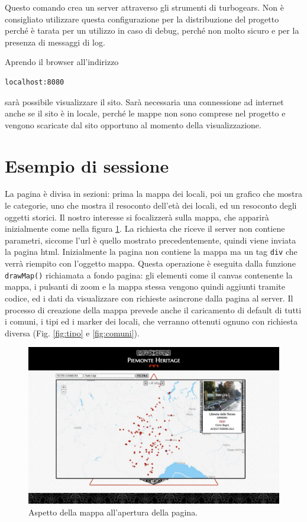 Questo comando crea un server attraverso gli strumenti di turbogears.
Non è consigliato utilizzare questa configurazione per la distribuzione del progetto perché è tarata per un utilizzo in caso di debug, perché non molto sicuro e per la presenza di messaggi di log.

Aprendo il browser all'indirizzo
\begin{lstlisting}
localhost:8080
\end{lstlisting} sarà possibile visualizzare il sito. Sarà necessaria una connessione ad internet anche se il sito è in locale, perché le mappe non sono comprese nel progetto e vengono scaricate dal sito opportuno al momento della visualizzazione.

\section{Esempio di sessione}
La pagina è divisa in sezioni: prima la mappa dei locali, poi un grafico che mostra le categorie, uno che mostra il resoconto dell'età dei locali, ed un resoconto degli oggetti storici. Il nostro interesse si focalizzerà sulla mappa, che apparirà inizialmente come nella figura \ref{fig:ini}.
La richiesta che riceve il server non contiene parametri, siccome l'url è quello mostrato precedentemente, quindi viene inviata la pagina html. Inizialmente la pagina non contiene la mappa ma un tag \texttt{div} che verrà riempito con l'oggetto mappa. Questa operazione è eseguita dalla funzione \texttt{drawMap()} richiamata a fondo pagina: gli elementi come il canvas contenente la mappa, i pulsanti di zoom e la mappa stessa vengono quindi aggiunti tramite codice, ed i dati da visualizzare con richieste asincrone dalla pagina al server. Il processo di creazione della mappa prevede anche il caricamento di default di tutti i comuni, i tipi ed i marker dei locali, che verranno ottenuti ognuno con richiesta diversa (Fig. \ref{fig:tipo} e \ref{fig:comuni}).

\begin{figure}[ht!]
	\caption{Aspetto della mappa all'apertura della pagina.}
	\label{fig:ini}
	\centering
		\includegraphics[width=\textwidth]{img/s1.jpg}
\end{figure}

